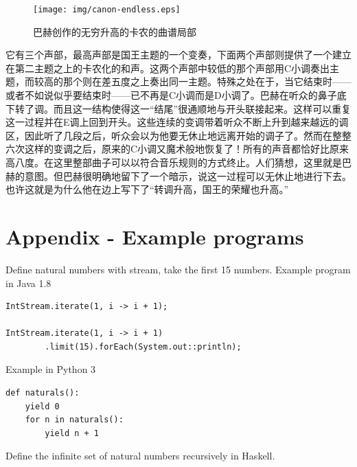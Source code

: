 \documentclass{article}
\begin{document}
\begin{figure}[htbp]
 \centering
 \texttt{[image: img/canon-endless.eps]}
 \captionsetup{labelformat=empty}
 \caption{巴赫创作的无穷升高的卡农的曲谱局部}
 \label{fig:canon-endless}
\end{figure}

它有三个声部，最高声部是国王主题的一个变奏，下面两个声部则提供了一个建立在第二主题之上的卡农化的和声。这两个声部中较低的那个声部用C小调奏出主题，而较高的那个则在差五度之上奏出同一主题。特殊之处在于，当它结束时——或者不如说似乎要结束时——已不再是C小调而是D小调了。巴赫在听众的鼻子底下转了调。而且这一结构使得这一“结尾”很通顺地与开头联接起来。这样可以重复这一过程并在E调上回到开头。这些连续的变调带着听众不断上升到越来越远的调区，因此听了几段之后，听众会以为他要无休止地远离开始的调子了。然而在整整六次这样的变调之后，原来的C小调又魔术般地恢复了！所有的声音都恰好比原来高八度。在这里整部曲子可以以符合音乐规则的方式终止。人们猜想，这里就是巴赫的意图。但巴赫很明确地留下了一个暗示，说这一过程可以无休止地进行下去。也许这就是为什么他在边上写下了“转调升高，国王的荣耀也升高。”\cite{GEB}

\begin{Exercise}
\end{Exercise}

\section{Appendix - Example programs}

Define natural numbers with stream, take the first 15 numbers. Example program in Java 1.8

\lstset{frame=single, language=Java}
\begin{lstlisting}
IntStream.iterate(1, i -> i + 1);

IntStream.iterate(1, i -> i + 1)
        .limit(15).forEach(System.out::println);
\end{lstlisting}

Example in Python 3

\lstset{frame=single, language=Python}
\begin{lstlisting}
def naturals():
    yield 0
    for n in naturals():
        yield n + 1
\end{lstlisting}

Define the infinite set of natural numbers recursively in Haskell.
\end{document}
